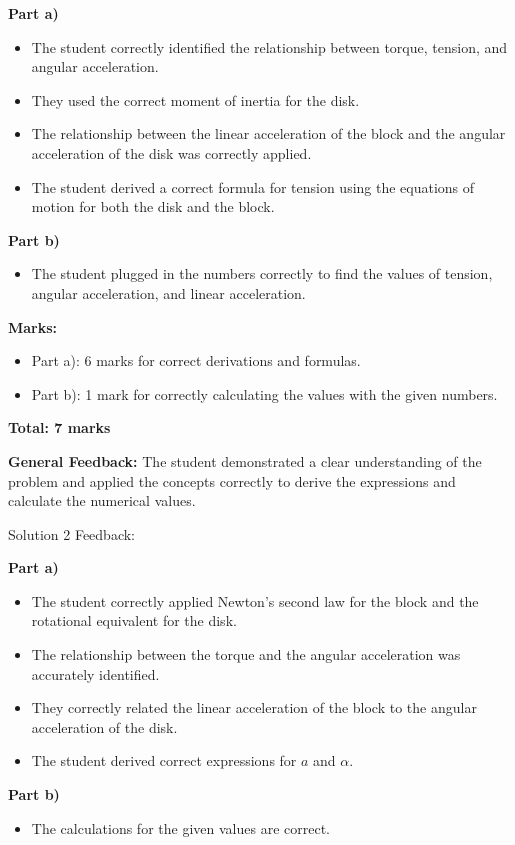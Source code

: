 \documentclass[a4paper,11pt]{article}
\begin{document}
\textbf{Part a)}
\begin{itemize}
    \item The student correctly identified the relationship between torque, tension, and angular acceleration.
    \item They used the correct moment of inertia for the disk.
    \item The relationship between the linear acceleration of the block and the angular acceleration of the disk was correctly applied.
    \item The student derived a correct formula for tension using the equations of motion for both the disk and the block.
\end{itemize}

\textbf{Part b)}
\begin{itemize}
    \item The student plugged in the numbers correctly to find the values of tension, angular acceleration, and linear acceleration.
\end{itemize}

\textbf{Marks:}
\begin{itemize}
    \item Part a): 6 marks for correct derivations and formulas.
    \item Part b): 1 mark for correctly calculating the values with the given numbers.
\end{itemize}

\textbf{Total: 7 marks}

\textbf{General Feedback:} The student demonstrated a clear understanding of the problem and applied the concepts correctly to derive the expressions and calculate the numerical values.

Solution 2 Feedback:

\textbf{Part a)}
\begin{itemize}
    \item The student correctly applied Newton's second law for the block and the rotational equivalent for the disk.
    \item The relationship between the torque and the angular acceleration was accurately identified.
    \item They correctly related the linear acceleration of the block to the angular acceleration of the disk.
    \item The student derived correct expressions for \( a \) and \( \alpha \).
\end{itemize}

\textbf{Part b)}
\begin{itemize}
    \item The calculations for the given values are correct.
\end{itemize}
\end{document}

